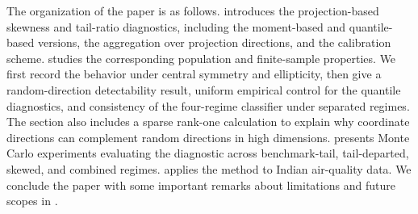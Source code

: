 \documentclass[11pt]{article}
\theoremstyle{plain}
\theoremstyle{definition}
\theoremstyle{remark}
\begin{document}

The organization of the paper is as follows.  introduces the projection-based skewness and tail-ratio diagnostics, including the moment-based and quantile-based versions, the aggregation over projection directions, and the calibration scheme.  studies the corresponding population and finite-sample properties. We first record the behavior under central symmetry and ellipticity, then give a random-direction detectability result, uniform empirical control for the quantile diagnostics, and consistency of the four-regime classifier under separated regimes. The section also includes a sparse rank-one calculation to explain why coordinate directions can complement random directions in high dimensions.  presents Monte Carlo experiments evaluating the diagnostic across benchmark-tail, tail-departed, skewed, and combined regimes.  applies the method to Indian air-quality data. We conclude the paper with some important remarks about limitations and future scopes in .
\end{document}
